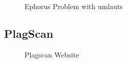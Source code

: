  \begin{figure}[!h]
  \centering
  \caption{Ephorus Problem with umlauts}
  \label{fig:Euphorus_umlauts}
\end{figure}













\newpage
\subsection{PlagScan} 

 \begin{figure}[!h]
  \centering
  \caption{Plagscan Website}
  \label{fig:plagawareWebsite}
\end{figure}


